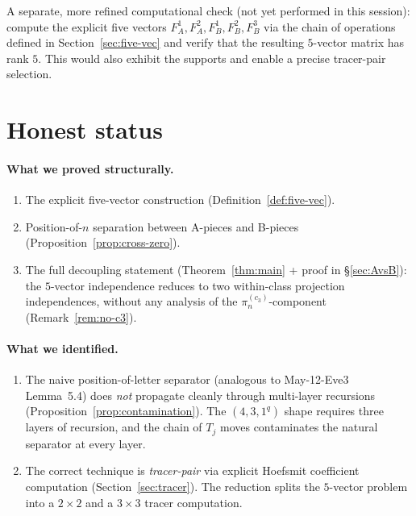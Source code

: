 \documentclass[11pt]{article}
\theoremstyle{definition}
\begin{document}
A separate, more refined computational check (not yet performed in
this session): compute the explicit five vectors $F_A^1, F_A^2, F_B^1,
F_B^2, F_B^3$ via the chain of operations defined in
Section~\ref{sec:five-vec} and verify that the resulting $5$-vector
matrix has rank $5$. This would also exhibit the supports and
enable a precise tracer-pair selection.

\section{Honest status}\label{sec:honest}

\paragraph{What we proved structurally.}
\begin{enumerate}[leftmargin=2em,topsep=0.2em,itemsep=0.1em]
\item The explicit five-vector construction
(Definition~\ref{def:five-vec}).
\item Position-of-$n$ separation between A-pieces and B-pieces
(Proposition~\ref{prop:cross-zero}).
\item The full decoupling statement (Theorem~\ref{thm:main} +
proof in \S\ref{sec:AvsB}): the $5$-vector independence reduces
to two within-class projection independences, without any analysis
of the $\pi^{(c_3)}_n$-component (Remark~\ref{rem:no-c3}).
\end{enumerate}

\paragraph{What we identified.}
\begin{enumerate}[leftmargin=2em,topsep=0.2em,itemsep=0.1em]
\item The naive position-of-letter separator (analogous to
May-12-Eve3 Lemma~5.4) does \emph{not} propagate cleanly through
multi-layer recursions (Proposition~\ref{prop:contamination}). The
$(4, 3, 1^q)$ shape requires three layers of recursion, and the
chain of $T_j$ moves contaminates the natural separator at every
layer.
\item The correct technique is \emph{tracer-pair} via explicit
Hoefsmit coefficient computation (Section~\ref{sec:tracer}). The
reduction splits the $5$-vector problem into a $2 \times 2$ and a
$3 \times 3$ tracer computation.
\end{enumerate}
\end{document}
